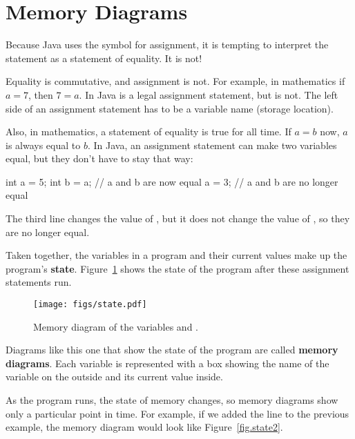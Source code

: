 \section{Memory Diagrams}
\label{state}

Because Java uses the \java{=} symbol for assignment, it is tempting to interpret the statement  as a statement of equality.
It is not!

Equality is commutative, and assignment is not.
For example, in mathematics if $a = 7$, then $7 = a$.
In Java  is a legal assignment statement, but  is not.
The left side of an assignment statement has to be a variable name (storage location).

Also, in mathematics, a statement of equality is true for all time.
If $a = b$ now, $a$ is always equal to $b$.
In Java, an assignment statement can make two variables equal, but they don't have to stay that way:

\begin{code}
int a = 5;
int b = a;     // a and b are now equal
a = 3;         // a and b are no longer equal
\end{code}

The third line changes the value of , but it does not change the value of , so they are no longer equal.


Taken together, the variables in a program and their current values make up the program's {\bf state}.
Figure~\ref{fig.state} shows the state of the program after these assignment statements run.

\begin{figure}[!ht]
\begin{center}
\texttt{[image: figs/state.pdf]}
\caption{Memory diagram of the variables  and .}
\label{fig.state}
\end{center}
\end{figure}


Diagrams like this one that show the state of the program are called {\bf memory diagrams}.
Each variable is represented with a box showing the name of the variable on the outside and its current value inside.

As the program runs, the state of memory changes, so memory diagrams show only a particular point in time.
For example, if we added the line  to the previous example, the memory diagram would look like Figure~\ref{fig.state2}.

